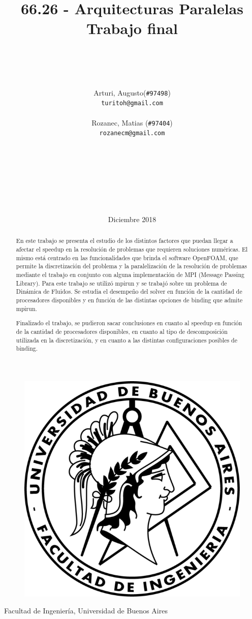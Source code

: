 \documentclass{article}
\title{66.26 - Arquitecturas Paralelas\\Trabajo final}
\author{
    \\\\\\\\
    Arturi, Augusto(\texttt{\#97498})\\\texttt{turitoh@gmail.com}\\
    \\
    Rozanec, Matias (\texttt{\#97404})\\\texttt{rozanecm@gmail.com}\\
    \\\\\\\\\\\\\\
}
\date{Diciembre 2018}
\begin{document}
\maketitle
\begin{figure}[!htp]
    \centering
    \includegraphics[scale=1]{../res/fiuba_logo.png} 
\end{figure}
\begin{center}\normalsize{Facultad de Ingeniería, Universidad de Buenos Aires}\end{center}
\newpage

\tableofcontents
\newpage

% 


\begin{abstract}
    En este trabajo se presenta el estudio de los distintos factores que puedan llegar a afectar el speedup en la resolución de problemas que requieren soluciones numéricas. El mismo está centrado en las funcionalidades que brinda el software OpenFOAM, que permite la discretización del problema y la paralelización de la resolución de problemas mediante el trabajo en conjunto con alguna implementación de MPI (Message Passing Library). Para este trabajo se utilizó mpirun y se trabajó sobre un problema de Dinámica de Fluidos. Se estudia el desempeño del solver en función de la cantidad de procesadores disponibles y en función de las distintas opciones de binding que admite mpirun. 

    Finalizado el trabajo, se pudieron sacar conclusiones en cuanto al speedup en función de la cantidad de procesadores disponibles, en cuanto al tipo de descomposición utilizada en la discretización, y en cuanto a las distintas configuraciones posibles de binding.

\end{abstract}
\newpage
\end{document}
